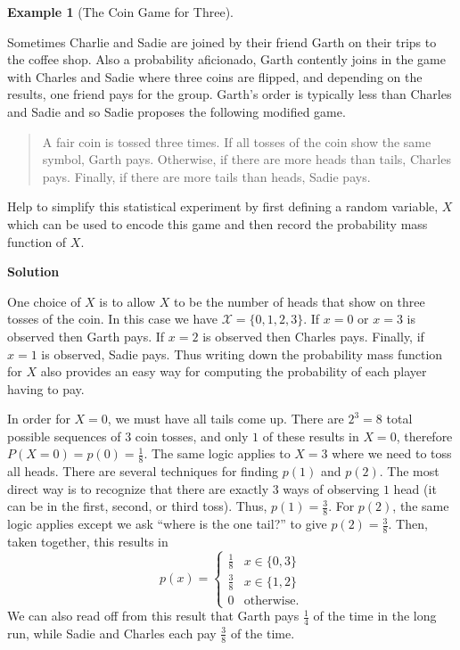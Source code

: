 \documentclass[
  letterpaper,
  DIV=11,
  numbers=noendperiod]{scrreprt}
\theoremstyle{definition}
\theoremstyle{definition}
\newtheorem{example}{Example}[chapter]
\theoremstyle{definition}
\theoremstyle{remark}
\begin{document}
\begin{example}[The Coin Game for
Three]\protect\hypertarget{exm-probability-mass-function}{}\label{exm-probability-mass-function}

Sometimes Charlie and Sadie are joined by their friend Garth on their
trips to the coffee shop. Also a probability aficionado, Garth contently
joins in the game with Charles and Sadie where three coins are flipped,
and depending on the results, one friend pays for the group. Garth's
order is typically less than Charles and Sadie and so Sadie proposes the
following modified game.

\begin{quote}
A fair coin is tossed three times. If all tosses of the coin show the
same symbol, Garth pays. Otherwise, if there are more heads than tails,
Charles pays. Finally, if there are more tails than heads, Sadie pays.
\end{quote}

Help to simplify this statistical experiment by first defining a random
variable, \(X\) which can be used to encode this game and then record
the probability mass function of \(X\).

\begin{tcolorbox}[enhanced jigsaw, colback=white, colframe=quarto-callout-color-frame, arc=.35mm, leftrule=.75mm, rightrule=.15mm, opacityback=0, breakable, bottomrule=.15mm, left=2mm, toprule=.15mm]

\vspace{-3mm}\textbf{Solution}\vspace{3mm}

One choice of \(X\) is to allow \(X\) to be the number of heads that
show on three tosses of the coin. In this case we have
\(\mathcal{X} = \{0,1,2,3\}\). If \(x = 0\) or \(x = 3\) is observed
then Garth pays. If \(x = 2\) is observed then Charles pays. Finally, if
\(x = 1\) is observed, Sadie pays. Thus writing down the probability
mass function for \(X\) also provides an easy way for computing the
probability of each player having to pay.

In order for \(X = 0\), we must have all tails come up. There are
\(2^3 = 8\) total possible sequences of \(3\) coin tosses, and only
\(1\) of these results in \(X = 0\), therefore
\(P(X = 0) = p(0) = \frac{1}{8}\). The same logic applies to \(X = 3\)
where we need to toss all heads. There are several techniques for
finding \(p(1)\) and \(p(2)\).\footnotemark{} The most direct way is to
recognize that there are exactly \(3\) ways of observing \(1\) head (it
can be in the first, second, or third toss). Thus,
\(p(1) = \frac{3}{8}\). For \(p(2)\), the same logic applies except we
ask ``where is the one tail?'' to give \(p(2) = \frac{3}{8}\). Then,
taken together, this results in \[p(x) = \begin{cases} 
\frac{1}{8} & x \in \{0, 3\} \\
\frac{3}{8} & x \in \{1, 2\} \\
0 & \text{otherwise}.\end{cases}\] We can also read off from this result
that Garth pays \(\frac{1}{4}\) of the time in the long run, while Sadie
and Charles each pay \(\frac{3}{8}\) of the time.\footnotemark{}


\end{tcolorbox}
\end{example}
\end{document}
